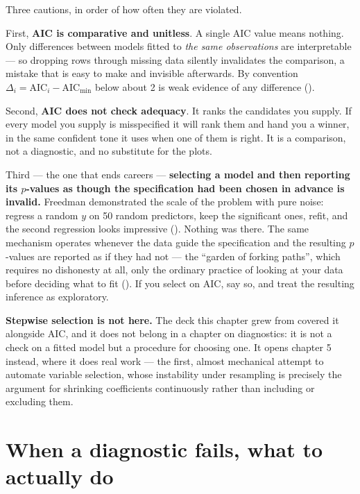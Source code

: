 \documentclass[
  letterpaper,
  10pt,
  twoside,
  openright,
  numbers=noenddot,
  chapterprefix=true]{scrbook}
\begin{document}
Three cautions, in order of how often they are violated.

First, \textbf{AIC is comparative and unitless}. A single AIC value
means nothing. Only differences between models fitted to \emph{the same
observations} are interpretable --- so dropping rows through missing
data silently invalidates the comparison, a mistake that is easy to make
and invisible afterwards. By convention
\(\Delta_i = \mathrm{AIC}_i - \mathrm{AIC}_{\min}\) below about 2 is
weak evidence of any difference ().

Second, \textbf{AIC does not check adequacy}. It ranks the candidates
you supply. If every model you supply is misspecified it will rank them
and hand you a winner, in the same confident tone it uses when one of
them is right. It is a comparison, not a diagnostic, and no substitute
for the plots.

Third --- the one that ends careers --- \textbf{selecting a model and
then reporting its \(p\)-values as though the specification had been
chosen in advance is invalid.} Freedman demonstrated the scale of the
problem with pure noise: regress a random \(y\) on 50 random predictors,
keep the significant ones, refit, and the second regression looks
impressive (). Nothing was
there. The same mechanism operates whenever the data guide the
specification and the resulting \(p\)-values are reported as if they had
not --- the ``garden of forking paths'', which requires no dishonesty at
all, only the ordinary practice of looking at your data before deciding
what to fit (). If you
select on AIC, say so, and treat the resulting inference as exploratory.

\begin{qmibstep}

\textbf{Stepwise selection is not here.} The deck this chapter grew from
covered it alongside AIC, and it does not belong in a chapter on
diagnostics: it is not a check on a fitted model but a procedure for
choosing one. It opens chapter 5 instead, where it does real work ---
the first, almost mechanical attempt to automate variable selection,
whose instability under resampling is precisely the argument for
shrinking coefficients continuously rather than including or excluding
them.

\end{qmibstep}

\section{When a diagnostic fails, what to actually
do}\label{when-a-diagnostic-fails-what-to-actually-do}
\end{document}
